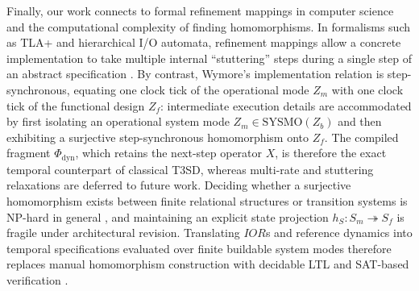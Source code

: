 Finally, our work connects to formal refinement mappings in computer science and the computational complexity of finding homomorphisms. In formalisms such as TLA+ and hierarchical I/O automata, refinement mappings allow a concrete implementation to take multiple internal ``stuttering'' steps during a single step of an abstract specification \citep{AbadiLamport1991,LynchTuttle1987,Lamport2002}. By contrast, Wymore's implementation relation is step-synchronous, equating one clock tick of the operational mode $Z_m$ with one clock tick of the functional design $Z_f$: intermediate execution details are accommodated by first isolating an operational system mode $Z_m\in\mathrm{SYSMO}(Z_b)$ and then exhibiting a surjective step-synchronous homomorphism onto $Z_f$. The compiled fragment $\Phi_{\mathrm{dyn}}$, which retains the next-step operator $X$, is therefore the exact temporal counterpart of classical T3SD, whereas multi-rate and stuttering relaxations are deferred to future work. Deciding whether a surjective homomorphism exists between finite relational structures or transition systems is NP-hard in general \citep{HellNesetril1990,BodirskyKaraMartin2012}, and maintaining an explicit state projection $h_S:S_m\twoheadrightarrow S_f$ is fragile under architectural revision. Translating $IOR$s and reference dynamics into temporal specifications evaluated over finite buildable system modes therefore replaces manual homomorphism construction with decidable LTL and SAT-based verification \citep{SistlaClarke1985,BaierKatoen2008}.
